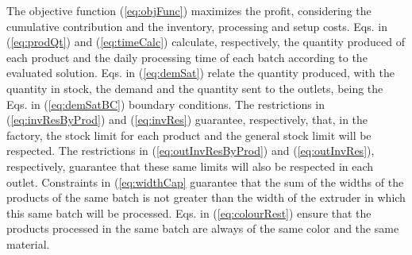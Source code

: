 The objective function (\ref{eq:objFunc}) maximizes the profit, considering the cumulative contribution and the inventory, processing and setup costs. Eqs. in (\ref{eq:prodQt}) and (\ref{eq:timeCalc}) calculate, respectively, the quantity produced of each product and the daily processing time of each batch according to the evaluated solution. Eqs. in (\ref{eq:demSat}) relate the quantity produced, with the quantity in stock, the demand and the quantity sent to the outlets, being the Eqs. in (\ref{eq:demSatBC}) boundary conditions. The restrictions in (\ref{eq:invResByProd}) and (\ref{eq:invRes}) guarantee, respectively, that, in the factory, the stock limit for each product and the general stock limit will be respected.  The restrictions in (\ref{eq:outInvResByProd}) and (\ref{eq:outInvRes}), respectively, guarantee that these same limits will also be respected in each outlet. Constraints in (\ref{eq:widthCap} guarantee that the sum of the widths of the products of the same batch is not greater than the width of the extruder in which this same batch will be processed. Eqs. in (\ref{eq:colourRest}) ensure that the products processed in the same batch are always of the same color and the same material.

